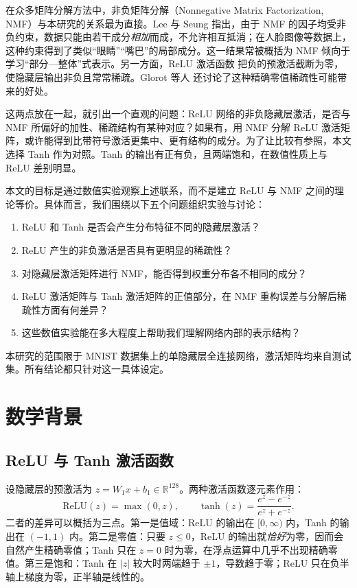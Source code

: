 \documentclass[UTF8,a4paper,11pt]{ctexart}
\begin{document}
在众多矩阵分解方法中，非负矩阵分解（Nonnegative Matrix Factorization, NMF）与本研究的关系最为直接。Lee 与 Seung \cite{lee1999learning} 指出，由于 NMF 的因子均受非负约束，数据只能由若干成分\emph{相加}而成，不允许相互抵消；在人脸图像等数据上，这种约束得到了类似“眼睛”“嘴巴”的局部成分。这一结果常被概括为 NMF 倾向于学习“部分—整体”式表示。另一方面，ReLU 激活函数 \cite{nair2010relu,glorot2011deep} 把负的预激活截断为零，使隐藏层输出非负且常常稀疏。Glorot 等人 \cite{glorot2011deep} 还讨论了这种精确零值稀疏性可能带来的好处。

这两点放在一起，就引出一个直观的问题：ReLU 网络的非负隐藏层激活，是否与 NMF 所偏好的加性、稀疏结构有某种对应？如果有，用 NMF 分解 ReLU 激活矩阵，或许能得到比带符号激活更集中、更有结构的成分。为了让比较有参照，本文选择 Tanh 作为对照。Tanh 的输出有正有负，且两端饱和，在数值性质上与 ReLU 差别明显。

本文的目标是通过数值实验观察上述联系，而不是建立 ReLU 与 NMF 之间的理论等价。具体而言，我们围绕以下五个问题组织实验与讨论：
\begin{enumerate}
  \item ReLU 和 Tanh 是否会产生分布特征不同的隐藏层激活？
  \item ReLU 产生的非负激活是否具有更明显的稀疏性？
  \item 对隐藏层激活矩阵进行 NMF，能否得到权重分布各不相同的成分？
  \item ReLU 激活矩阵与 Tanh 激活矩阵的正值部分，在 NMF 重构误差与分解后稀疏性方面有何差异？
  \item 这些数值实验能在多大程度上帮助我们理解网络内部的表示结构？
\end{enumerate}

本研究的范围限于 MNIST 数据集上的单隐藏层全连接网络，激活矩阵均来自测试集。所有结论都只针对这一具体设定。

\section{数学背景}

\subsection{ReLU 与 Tanh 激活函数}

设隐藏层的预激活为 $z=W_1x+b_1\in\mathbb{R}^{128}$。两种激活函数逐元素作用：
\begin{equation}
  \mathrm{ReLU}(z)=\max(0,z),\qquad
  \tanh(z)=\frac{e^{z}-e^{-z}}{e^{z}+e^{-z}}.
\end{equation}
二者的差异可以概括为三点。第一是值域：ReLU 的输出在 $[0,\infty)$ 内，Tanh 的输出在 $(-1,1)$ 内。第二是零值：只要 $z\le0$，ReLU 的输出就\emph{恰好}为零，因而会自然产生精确零值；Tanh 只在 $z=0$ 时为零，在浮点运算中几乎不出现精确零值。第三是饱和：Tanh 在 $|z|$ 较大时两端趋于 $\pm1$，导数趋于零；ReLU 只在负半轴上梯度为零，正半轴是线性的。
\end{document}
